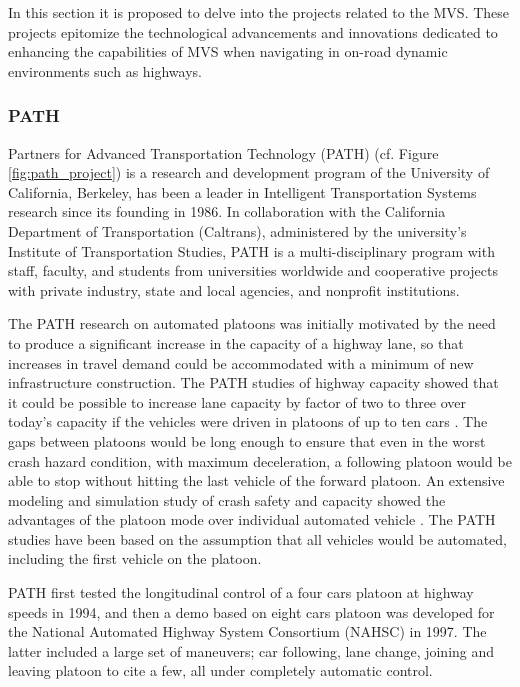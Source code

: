 In this section it is proposed to delve into the projects related to the MVS. These projects epitomize the technological advancements and innovations dedicated to enhancing the capabilities of MVS when navigating in on-road dynamic environments such as highways. 

\subsubsection{PATH} \label{PathProject}
Partners for Advanced Transportation Technology (PATH) 
\cite{PathProject1} (cf. Figure \ref{fig:path_project}) is a research and development program of the University of California, Berkeley, has been a leader in Intelligent Transportation Systems research since its founding in 1986. In collaboration with the California Department of Transportation (Caltrans), administered by the university’s Institute of Transportation Studies, PATH is a multi-disciplinary program with staff, faculty, and students from universities worldwide and cooperative projects with private industry, state and local agencies, and nonprofit institutions.

The PATH research on automated platoons was initially motivated by the need to produce a significant increase in the capacity of a highway lane, so that increases in travel demand could be accommodated with a minimum of new infrastructure construction. The PATH studies of highway capacity showed that it could be possible to increase lane capacity by factor of two to three over today's capacity if the vehicles were driven in platoons of up to ten cars \cite{michael1998capacity}. The gaps between platoons would be long enough to ensure that even in the worst crash hazard condition, with maximum deceleration, a following platoon would be able to stop without hitting the last vehicle of the forward platoon. An extensive modeling and simulation study of crash safety and capacity showed the advantages of the platoon mode over individual automated vehicle \cite{carbaugh1998safety}. The PATH studies have been based on the assumption that all vehicles would be automated, including the first vehicle on the platoon. 

PATH first tested the longitudinal control of a four cars platoon at highway speeds in 1994, and then a demo based on eight cars platoon was developed for the National Automated Highway System Consortium (NAHSC) in 1997. The latter included a large set of maneuvers; car following, lane change, joining and leaving platoon to cite a few, all under completely automatic control. 

